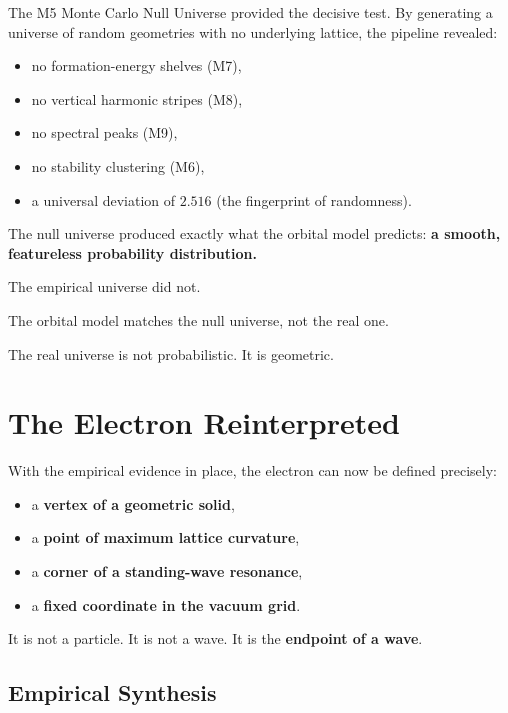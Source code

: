\documentclass[11pt, letterpaper, openany]{book}
\begin{document}
The M5 Monte Carlo Null Universe provided the decisive test. By generating a universe of
random geometries with no underlying lattice, the pipeline revealed:

\begin{itemize}
    \item no formation-energy shelves (M7),
    \item no vertical harmonic stripes (M8),
    \item no spectral peaks (M9),
    \item no stability clustering (M6),
    \item a universal deviation of $2.516$ (the fingerprint of randomness).
\end{itemize}

The null universe produced exactly what the orbital model predicts:  
\textbf{a smooth, featureless probability distribution.}

The empirical universe did not.

\begin{tcolorbox}[colback=black!5,colframe=black,title=Empirical Verdict]
The orbital model matches the null universe, not the real one.
\end{tcolorbox}

The real universe is not probabilistic.  
It is geometric.

\section{The Electron Reinterpreted}

With the empirical evidence in place, the electron can now be defined precisely:

\begin{itemize}
    \item a \textbf{vertex of a geometric solid},
    \item a \textbf{point of maximum lattice curvature},
    \item a \textbf{corner of a standing-wave resonance},
    \item a \textbf{fixed coordinate in the vacuum grid}.
\end{itemize}

It is not a particle.  
It is not a wave.  
It is the \textbf{endpoint of a wave}.

\subsection*{Empirical Synthesis}
\end{document}
